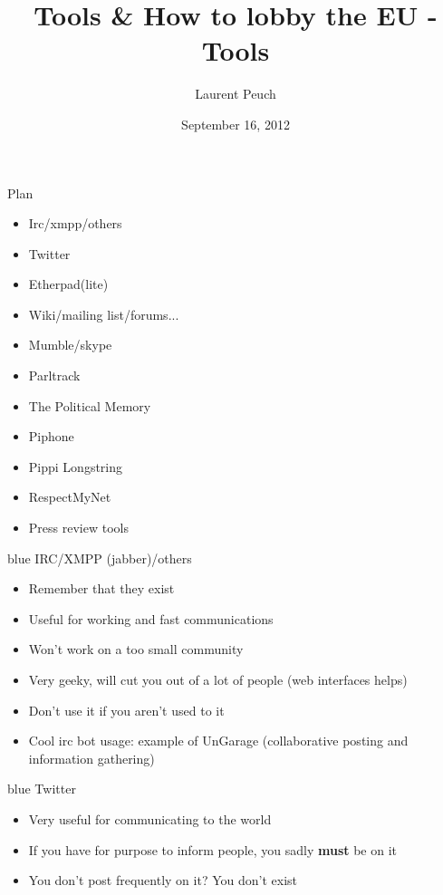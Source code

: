 \documentclass{beamer}
\begin{document}
\title{Tools \& How to lobby the EU - Tools}
\author{Laurent Peuch}
\date{September 16, 2012}

\maketitle{}

\begin{frame}{Plan}
\begin{itemize}
    \item Irc/xmpp/others
    \item Twitter
    \item Etherpad(lite)
    \item Wiki/mailing list/forums...
    \item Mumble/skype
    \item Parltrack
    \item The Political Memory
    \item Piphone
    \item Pippi Longstring
    \item RespectMyNet
    \item Press review tools
\end{itemize}
\end{frame}

\begin{frame}[fragile]{}
\begin{LARGE}
\begin{color}{blue}
IRC/XMPP (jabber)/others
\end{color}
\end{LARGE}
\vspace{3mm}
\begin{itemize}
    \item Remember that they exist
    \item Useful for working and fast communications
    \item Won't work on a too small community
    \item Very geeky, will cut you out of a lot of people (web interfaces helps)
    \item Don't use it if you aren't used to it
    \item Cool irc bot usage: example of UnGarage (collaborative posting and information gathering)
\end{itemize}
\end{frame}

\begin{frame}[fragile]{}
\begin{LARGE}
\begin{color}{blue}
Twitter
\end{color}
\end{LARGE}
\vspace{3mm}
\begin{itemize}
    \item Very useful for communicating to the world
    \item If you have for purpose to inform people, you sadly \textbf{must} be on it
    \item You don't post frequently on it? You don't exist
\end{itemize}
\end{frame}
\end{document}
